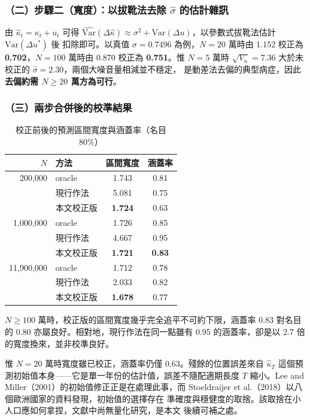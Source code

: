 \documentclass[UTF8, fontset=macnew, a4paper, 12pt]{ctexart}
\begin{document}
\subsubsection{（二）步驟二（寬度）：以拔靴法去除 $\hat\sigma$ 的估計雜訊}

由 $\hat\kappa_t=\kappa_t+u_t$ 可得
$\widehat{\mathrm{Var}}(\Delta\hat\kappa)\approx\sigma^2
+\mathrm{Var}(\Delta u)$，以參數式拔靴法估計 $\mathrm{Var}(\Delta u^*)$ 後
扣除即可。以真值 $\sigma=0.7496$ 為例，$N=20$ 萬時由 1.152 校正為
\textbf{0.702}，$N=100$ 萬時由 0.870 校正為 \textbf{0.751}。惟 $N=5$ 萬時
$\sqrt{V_u}=7.36$ 大於未校正的 $\hat\sigma=2.30$，兩個大噪音量相減並不穩定，
是動差法去偏的典型病症，因此\textbf{去偏約需 $N\ge20$ 萬方為可行}。

\subsubsection{（三）兩步合併後的校準結果}

\begin{table}[H]
\centering
\caption{校正前後的預測區間寬度與涵蓋率（名目 80\%）}
\small
\begin{tabular}{rlcc}
\toprule
$N$ & 方法 & 區間寬度 & 涵蓋率\\
\midrule
200,000 & oracle & 1.743 & 0.81\\
        & 現行作法 & 5.081 & 0.75\\
        & 本文校正版 & \textbf{1.724} & 0.63\\
\midrule
1,000,000 & oracle & 1.726 & 0.85\\
          & 現行作法 & 4.667 & 0.95\\
          & 本文校正版 & \textbf{1.721} & \textbf{0.83}\\
\midrule
11,900,000 & oracle & 1.712 & 0.78\\
           & 現行作法 & 2.033 & 0.82\\
           & 本文校正版 & \textbf{1.678} & 0.77\\
\bottomrule
\end{tabular}
\label{tab:calib}
\end{table}

$N\ge100$ 萬時，校正版的區間寬度幾乎完全追平不可約下限，涵蓋率 0.83 對名目
的 0.80 亦屬良好。相對地，現行作法在同一點雖有 0.95 的涵蓋率，卻是以 2.7
倍的寬度換來，並非校準良好。

惟 $N=20$ 萬時寬度雖已校正，涵蓋率仍僅 0.63。殘餘的位置誤差來自
$\hat\kappa_T$ 這個預測初始值本身——它是單一年份的估計值，誤差不隨配適期長度
$T$ 縮小。Lee and Miller（2001）的初始值修正正是在處理此事，而
Stoeldraijer et al.（2018）以八個歐洲國家的資料發現，初始值的選擇存在
準確度與穩健度的取捨。該取捨在小人口應如何拿捏，文獻中尚無量化研究，是本文
後續可補之處。
\end{document}
